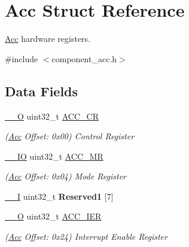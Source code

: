 \hypertarget{structAcc}{}\section{Acc Struct Reference}
\label{structAcc}


\mbox{\hyperlink{structAcc}{Acc}} hardware registers.  




{\ttfamily \#include $<$component\+\_\+acc.\+h$>$}

\subsection*{Data Fields}
\begin{DoxyCompactItemize}
\item 
\mbox{\label{structAcc_a15f43052e7ad844b6b0cf04e207c3457}} 
\mbox{\hyperlink{core__cm7_8h_a7e25d9380f9ef903923964322e71f2f6}{\+\_\+\+\_\+O}} uint32\+\_\+t \mbox{\hyperlink{structAcc_a15f43052e7ad844b6b0cf04e207c3457}{A\+C\+C\+\_\+\+CR}}
\begin{DoxyCompactList}\small\item\em (\mbox{\hyperlink{structAcc}{Acc}} Offset\+: 0x00) Control Register \end{DoxyCompactList}\item 
\mbox{\label{structAcc_abe6aa044eed10deae1a49b99c52b0ad6}} 
\mbox{\hyperlink{core__cm7_8h_aec43007d9998a0a0e01faede4133d6be}{\+\_\+\+\_\+\+IO}} uint32\+\_\+t \mbox{\hyperlink{structAcc_abe6aa044eed10deae1a49b99c52b0ad6}{A\+C\+C\+\_\+\+MR}}
\begin{DoxyCompactList}\small\item\em (\mbox{\hyperlink{structAcc}{Acc}} Offset\+: 0x04) Mode Register \end{DoxyCompactList}\item 
\mbox{\label{structAcc_ab33e9a864f15096c80957718933e69ea}} 
\mbox{\hyperlink{core__cm7_8h_af63697ed9952cc71e1225efe205f6cd3}{\+\_\+\+\_\+I}} uint32\+\_\+t {\bfseries Reserved1} \mbox{[}7\mbox{]}
\item 
\mbox{\label{structAcc_abc98949aa6025cbf765d0fcc92cf435c}} 
\mbox{\hyperlink{core__cm7_8h_a7e25d9380f9ef903923964322e71f2f6}{\+\_\+\+\_\+O}} uint32\+\_\+t \mbox{\hyperlink{structAcc_abc98949aa6025cbf765d0fcc92cf435c}{A\+C\+C\+\_\+\+I\+ER}}
\begin{DoxyCompactList}\small\item\em (\mbox{\hyperlink{structAcc}{Acc}} Offset\+: 0x24) Interrupt Enable Register \end{DoxyCompactList}\item 

\end{DoxyCompactItemize}
